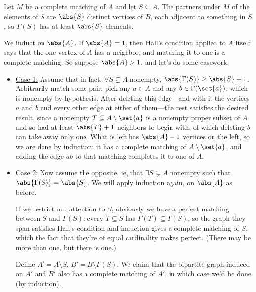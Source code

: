 \begin{iffproof}
    \onlyifdir Let $M$ be a complete matching of $A$ and let $S \subseteq A$. The partners under $M$ of the elements of $S$ are $\abs{S}$ distinct vertices of $B$, each adjacent to something in $S$, so $\Gamma(S)$ has at least $\abs{S}$ elements.

    \ifdir We induct on $\abs{A}$. If $\abs{A} = 1$, then Hall's condition applied to $A$ itself says that the one vertex of $A$ has a neighbor, and matching it to one is a complete matching. So suppose $\abs{A} > 1$, and let's do some casework.
    \begin{itemize}
        \item \underline{Case 1:} Assume that in fact, $\forall S \subsetneq A$ nonempty, $\abs{\Gamma(S)} \geq \abs{S} + 1$. Arbitrarily match some pair: pick any $a \in A$ and any $b \in \Gamma(\set{a})$, which is nonempty by hypothesis. After deleting this edge---and with it the vertices $a$ and $b$ and every other edge at either of them---the rest satisfies the desired result, since a nonempty $T \subseteq A \setminus \set{a}$ is a nonempty proper subset of $A$ and so had at least $\abs{T} + 1$ neighbors to begin with, of which deleting $b$ can take away only one. What is left has $\abs{A} - 1$ vertices on the left, so we are done by induction: it has a complete matching of $A \setminus \set{a}$, and adding the edge $ab$ to that matching completes it to one of $A$.

            \item \underline{Case 2:} Now assume the opposite, ie, that $\exists S \subsetneq A$ nonempty such that $\abs{\Gamma(S)} = \abs{S}$. We will apply induction again, on $\abs{A}$ as before.

            If we restrict our attention to $S$, obviously we have a perfect matching between $S$ and $\Gamma(S)$: every $T \subseteq S$ has $\Gamma(T) \subseteq \Gamma(S)$, so the graph they span satisfies Hall's condition and induction gives a complete matching of $S$, which the fact that they're of equal cardinality makes perfect. (There may be more than one, but there is one.)

            Define $A' = A \setminus S$, $B' = B \setminus \Gamma(S)$. We claim that the bipartite graph induced on $A'$ and $B'$ also has a complete matching of $A'$, in which case we'd be done (by induction).


\end{itemize}
\end{iffproof}
